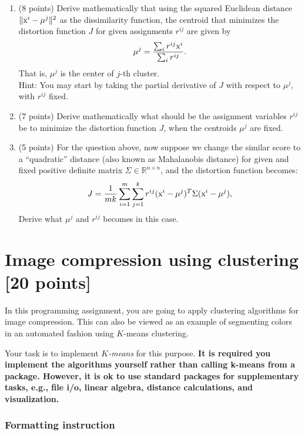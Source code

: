 \documentclass[twoside,10pt]{article}
\begin{document}
\begin{enumerate}

\item (8 points) Derive mathematically that using the squared Euclidean distance $\|\text x^i-\mu^j\|^2$ as the dissimilarity function, the centroid that minimizes the distortion function $J$  for given assignments $r^{ij}$ are given by
   $$\mu^j=\frac{\sum_i r^{ij} \text x^i}{\sum_i r^{ij}}.$$
   That is, $\mu^j$ is the center of $j$-th cluster.  \\
   Hint: You may start by taking the partial derivative of $J$ with respect to $\mu^j$, with $r^{ij}$ fixed.
   
   
\item (7 points) Derive mathematically what should be the assignment variables $r^{ij}$ be to minimize the distortion function $J$, when the centroids $\mu^j$ are fixed.

\item (5 points) For the question above, now suppose we change the similar score to a ``quadratic'' distance (also known as Mahalanobis distance) for given and fixed positive definite matrix $\Sigma \in \mathbb R^{n\times n}$, and the distortion function becomes:
\[
J = \frac{1}{mk}\sum_{i=1}^m\sum_{j=1}^k r^{ij} (\text x^i-\mu^j)^T \Sigma  (\text x^i-\mu^j),
\]
Derive what $\mu^{j}$ and $r^{ij}$ becomes in this case.

\end{enumerate}



\section{Image compression using clustering [20 points]}

In this programming assignment, you are going to apply clustering algorithms for image compression. This can also be viewed as an example of segmenting colors in an automated fashion using $K$-means clustering.

Your task is to implement \emph{$K$-means} for this purpose.  {\bf It is required you implement the algorithms yourself rather than calling k-means from a package. However, it is ok to use standard packages for supplementary tasks, e.g., file i/o, linear algebra, distance calculations, and visualization.} 


\subsubsection*{Formatting instruction}
\end{document}
